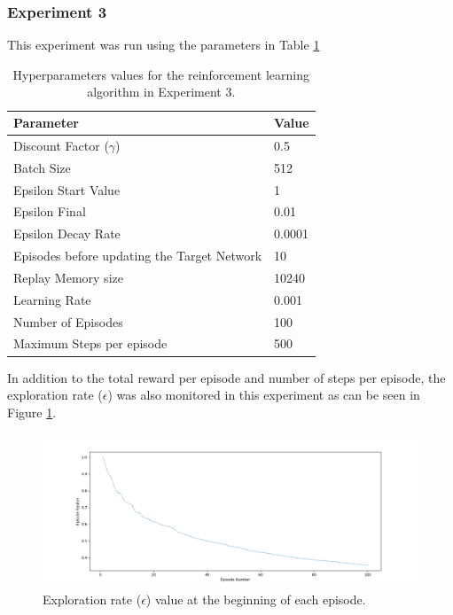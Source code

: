 \documentclass[12pt,oneside]{article}
\begin{document}
\subsubsection{Experiment 3}\label{experiment:experiment-3}
This experiment was run using the parameters in Table \ref{tab:hyperparams-exp-3}
\begin{table}[H]
\centering
\begin{tabular}{l l}
\hline
Parameter & Value \\
\hline
Discount Factor ($\gamma$) & 0.5 \\
Batch Size & 512 \\
Epsilon Start Value & 1 \\
Epsilon Final & 0.01 \\
Epsilon Decay Rate & 0.0001 \\
Episodes before updating the Target Network & 10 \\
Replay Memory size & 10240 \\
Learning Rate & 0.001 \\
Number of Episodes & 100 \\
Maximum Steps per episode & 500 \\
\hline
\end{tabular}
\caption{Hyperparameters values for the reinforcement learning algorithm in Experiment 3.}
\label{tab:hyperparams-exp-3}
\end{table}
In addition to the total reward per episode and number of steps per episode, the exploration rate ($\epsilon$) was also monitored in this experiment as can be seen in Figure \ref{fig:epsilon_episodes_100_gamma_05}.
\begin{figure}[H]
\centering
\includegraphics[width=0.9\linewidth]{epsilon_episodes_100_gamma_05.png}
\caption{Exploration rate ($\epsilon$) value at the beginning of each episode. }
\label{fig:epsilon_episodes_100_gamma_05}
\end{figure}
\end{document}
